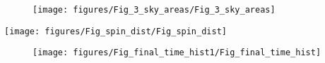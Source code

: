 \documentclass[iop,apj,twocolumn,twocolappendix,numberedappendix]{emulateapj}
\begin{document}


\begin{figure}
  \centering
  \texttt{[image: figures/Fig\_3\_sky\_areas/Fig\_3\_sky\_areas]}
  \caption{\protect} 
\end{figure}







\begin{figure*}
  \centering
  \texttt{[image: figures/Fig\_spin\_dist/Fig\_spin\_dist]}
  \caption{\protect} 
\end{figure*}







\begin{figure}
  \centering
  \texttt{[image: figures/Fig\_final\_time\_hist1/Fig\_final\_time\_hist]}
  \caption{\protect} 
\end{figure}


 
\end{document}
